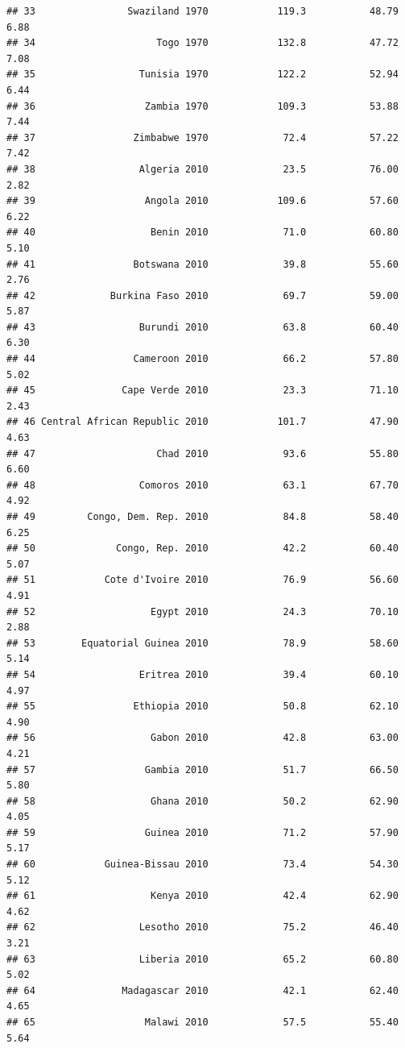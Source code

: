 \documentclass[
]{article}
\begin{document}
\begin{verbatim}
## 33                Swaziland 1970            119.3           48.79      6.88
## 34                     Togo 1970            132.8           47.72      7.08
## 35                  Tunisia 1970            122.2           52.94      6.44
## 36                   Zambia 1970            109.3           53.88      7.44
## 37                 Zimbabwe 1970             72.4           57.22      7.42
## 38                  Algeria 2010             23.5           76.00      2.82
## 39                   Angola 2010            109.6           57.60      6.22
## 40                    Benin 2010             71.0           60.80      5.10
## 41                 Botswana 2010             39.8           55.60      2.76
## 42             Burkina Faso 2010             69.7           59.00      5.87
## 43                  Burundi 2010             63.8           60.40      6.30
## 44                 Cameroon 2010             66.2           57.80      5.02
## 45               Cape Verde 2010             23.3           71.10      2.43
## 46 Central African Republic 2010            101.7           47.90      4.63
## 47                     Chad 2010             93.6           55.80      6.60
## 48                  Comoros 2010             63.1           67.70      4.92
## 49         Congo, Dem. Rep. 2010             84.8           58.40      6.25
## 50              Congo, Rep. 2010             42.2           60.40      5.07
## 51            Cote d'Ivoire 2010             76.9           56.60      4.91
## 52                    Egypt 2010             24.3           70.10      2.88
## 53        Equatorial Guinea 2010             78.9           58.60      5.14
## 54                  Eritrea 2010             39.4           60.10      4.97
## 55                 Ethiopia 2010             50.8           62.10      4.90
## 56                    Gabon 2010             42.8           63.00      4.21
## 57                   Gambia 2010             51.7           66.50      5.80
## 58                    Ghana 2010             50.2           62.90      4.05
## 59                   Guinea 2010             71.2           57.90      5.17
## 60            Guinea-Bissau 2010             73.4           54.30      5.12
## 61                    Kenya 2010             42.4           62.90      4.62
## 62                  Lesotho 2010             75.2           46.40      3.21
## 63                  Liberia 2010             65.2           60.80      5.02
## 64               Madagascar 2010             42.1           62.40      4.65
## 65                   Malawi 2010             57.5           55.40      5.64

\end{verbatim}
\end{document}
